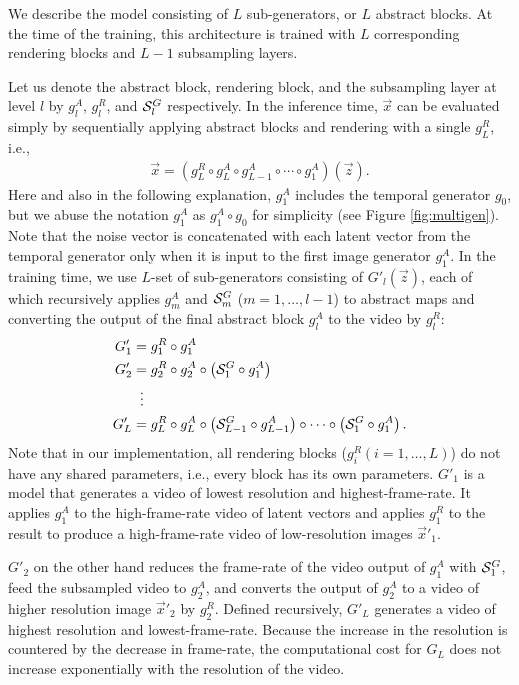 \documentclass[twocolumn]{svjour3}
\def\Fig#1{Figure \ref{fig:#1}}
\begin{document}
We describe the model consisting of $L$ sub-generators, or $L$ abstract blocks.
At the time of the training, this architecture is trained with $L$ corresponding rendering blocks and $L-1$ subsampling layers.


Let us denote the abstract block, rendering block, and the subsampling layer at level $l$ by $g^A_l$, $g^R_l$, and ${\cal S}^G_l$ respectively.
In the inference time, $\vec{x}$ can be evaluated simply by sequentially applying abstract blocks and rendering with a single $g^R_L$, i.e.,
\begin{align}
    \vec{x} = \left( g^R_L \circ g^A_L \circ g^A_{L - 1} \circ \cdots \circ g^A_1 \right) (\vec{z}).
\end{align}
Here and also in the following explanation, $g^A_1$ includes the temporal generator $g_0$, but we abuse the notation $g^A_1$ as $g^A_1 \circ g_0$ for simplicity (see \Fig{multigen}).
Note that the noise vector is concatenated with each latent vector from the temporal generator only when it is input to the first image generator $g^A_1$.
In the training time, we use $L$-set of sub-generators consisting of $G'_l(\vec{z})$, each of which recursively applies $g^A_m$ and ${\cal S}^G_m$ ($m=1, \dots, l - 1$) to abstract maps and converting the output of the final abstract block $g^A_l$ to the video by $g^R_l$:
\begin{align}
\label{eqn:multigen}
    G'_1 &= g_1^R \circ g_1^A \nonumber \\
    G'_2 &= g_2^R \circ g_2^A \circ \left( {\cal S}^G_1 \circ g_1^A \right) \nonumber \\
    &\;\;\vdots \nonumber \\
    G'_L &= g_L^R \circ g_L^A \circ \left( {\cal S}^G_{L-1} \circ g_{L-1}^A \right) \circ \cdots \circ \left( {\cal S}^G_1 \circ g_1^A \right).
\end{align}
Note that in our implementation, all rendering blocks ($g_i^R (i=1,\dots,L)$) do not have any shared parameters, i.e., every block has its own parameters.
$G'_1$ is a model that generates a video of lowest resolution and highest-frame-rate.
It applies $g_1^A$ to the high-frame-rate video of latent vectors and applies $g_1^R$ to the result to produce a high-frame-rate video of low-resolution images $\vec{x}'_1$.

$G'_2$ on the other hand reduces the frame-rate of the video output of $g_1^A$ with ${\cal S}_1^G$, feed the subsampled video to $g_2^A$, and converts the output of $g_2^A$ to a video of higher resolution image $\vec{x}'_2$ by $g_2^R$.
Defined recursively, $G'_L$ generates a video of highest resolution and lowest-frame-rate.
Because the increase in the resolution is countered by the decrease in frame-rate, the computational cost for $G_L$ does not increase exponentially with the resolution of the video.
\end{document}
